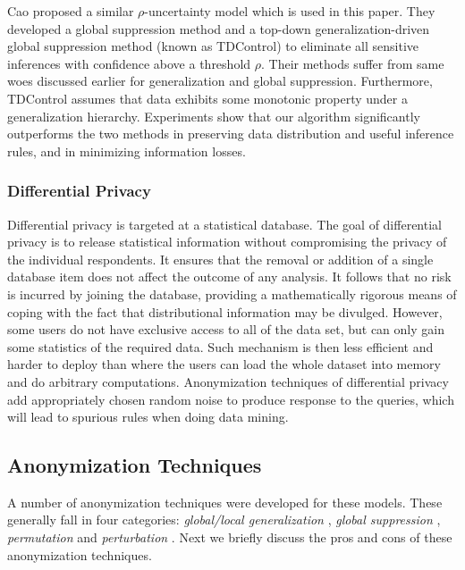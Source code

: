 Cao \etal \cite{Cao:2010:rho} proposed a similar $\rho$-uncertainty model
which is used in this paper. They developed a global suppression method and a top-down generalization-driven global suppression method (known as TDControl) to eliminate all sensitive inferences with confidence above
a threshold $\rho$.
Their methods suffer from same woes discussed earlier for generalization and
global suppression. Furthermore, TDControl assumes that data exhibits some monotonic property under a generalization hierarchy. 
Experiments show that our algorithm significantly outperforms the two methods in preserving data distribution and useful inference rules, and in minimizing information losses.

\subsubsection{Differential Privacy}

Differential privacy \cite{Dwork08:diff:survey}
is targeted at a statistical database. The goal of differential privacy is to release statistical information without compromising the privacy of the individual respondents.
It ensures that the removal or addition of a single database item does not affect the outcome of any analysis. It follows that no risk is incurred by joining the database,
providing a mathematically rigorous means of coping with
the fact that distributional information may be divulged.
However, 
some users do not have exclusive access to all of the data set, but can only gain some statistics of the required data.
Such mechanism is then less efficient and harder to
deploy than where the users can load the
whole dataset into memory and do arbitrary computations.
Anonymization techniques of differential privacy add appropriately chosen random noise to produce response to the queries, which will lead to spurious rules when doing data mining.

\subsection{Anonymization Techniques}

A number of anonymization techniques were developed for these models.
These generally fall in four categories\cite{Machanavajjhala12}: {\em
global/local generalization}
\cite{samarati1998,Iyengar:2002:TDS,LeFevre:2006:Mondrian,Terrovitis:2008:PAS,He:2009:ASD,Cao:2010:rho}, {\em global suppression} \cite{atallah99:disclosure,Xu:2008:ATD,Cao:2010:rho},
{\em permutation} \cite{2011:TKDE:Anonymous} and {\em perturbation}
\cite{Zhang:2007:agg,ChenMFDX11:Diff,Javier2012,WangW05}. Next we briefly discuss the pros and
cons of these anonymization techniques.

